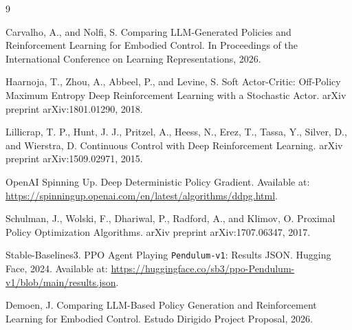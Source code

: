 \documentclass[11pt,a4paper]{article}
\begin{document}
\begin{thebibliography}{9}

Carvalho, A., and Nolfi, S. Comparing LLM-Generated Policies and Reinforcement Learning for Embodied Control. In Proceedings of the International Conference on Learning Representations, 2026.

Haarnoja, T., Zhou, A., Abbeel, P., and Levine, S. Soft Actor-Critic: Off-Policy Maximum Entropy Deep Reinforcement Learning with a Stochastic Actor. arXiv preprint arXiv:1801.01290, 2018.

Lillicrap, T. P., Hunt, J. J., Pritzel, A., Heess, N., Erez, T., Tassa, Y., Silver, D., and Wierstra, D. Continuous Control with Deep Reinforcement Learning. arXiv preprint arXiv:1509.02971, 2015.

OpenAI Spinning Up. Deep Deterministic Policy Gradient. Available at: \url{https://spinningup.openai.com/en/latest/algorithms/ddpg.html}.

Schulman, J., Wolski, F., Dhariwal, P., Radford, A., and Klimov, O. Proximal Policy Optimization Algorithms. arXiv preprint arXiv:1707.06347, 2017.

Stable-Baselines3. PPO Agent Playing \texttt{Pendulum-v1}: Results JSON. Hugging Face, 2024. Available at: \url{https://huggingface.co/sb3/ppo-Pendulum-v1/blob/main/results.json}.

Demoen, J. Comparing LLM-Based Policy Generation and Reinforcement Learning for Embodied Control. Estudo Dirigido Project Proposal, 2026.

\end{thebibliography}
\end{document}
